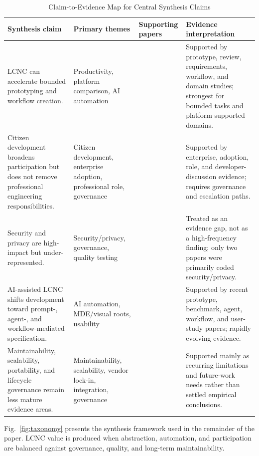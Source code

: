 \documentclass[conference]{IEEEtran}
\begin{document}
\begin{table}[t]
\centering
\caption{Claim-to-Evidence Map for Central Synthesis Claims}
\label{tab:claimmap}
\scriptsize
\begin{tabularx}{\textwidth}{p{} p{} p{} X}
\toprule
Synthesis claim & Primary themes & Supporting papers & Evidence interpretation \\
\midrule
LCNC can accelerate bounded prototyping and workflow creation. & Productivity, platform comparison, AI automation & \cite{p04,p07,p18,p29,p31,p35,p46,p48} & Supported by prototype, review, requirements, workflow, and domain studies; strongest for bounded tasks and platform-supported domains. \\
Citizen development broadens participation but does not remove professional engineering responsibilities. & Citizen development, enterprise adoption, professional role, governance & \cite{p12,p13,p16,p18,p30,p47,p49} & Supported by enterprise, adoption, role, and developer-discussion evidence; requires governance and escalation paths. \\
Security and privacy are high-impact but under-represented. & Security/privacy, governance, quality testing & \cite{p15,p26,p28,p30} & Treated as an evidence gap, not as a high-frequency finding; only two papers were primarily coded security/privacy. \\
AI-assisted LCNC shifts development toward prompt-, agent-, and workflow-mediated specification. & AI automation, MDE/visual roots, usability & \cite{p04,p05,p06,p07,p08,p31,p32,p35,p40,p41,p42,p50} & Supported by recent prototype, benchmark, agent, workflow, and user-study papers; rapidly evolving evidence. \\
Maintainability, scalability, portability, and lifecycle governance remain less mature evidence areas. & Maintainability, scalability, vendor lock-in, integration, governance & \cite{p12,p14,p15,p26,p29,p30,p34,p41,p49} & Supported mainly as recurring limitations and future-work needs rather than settled empirical conclusions. \\
\bottomrule
\end{tabularx}
\end{table}

Fig.~\ref{fig:taxonomy} presents the synthesis framework used in the remainder of the paper. LCNC value is produced when abstraction, automation, and participation are balanced against governance, quality, and long-term maintainability.
\end{document}

